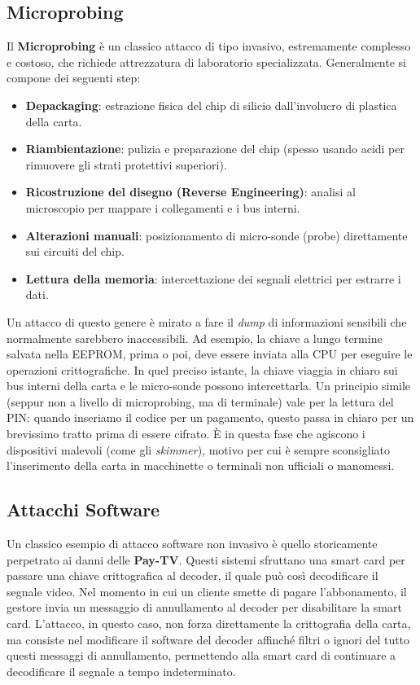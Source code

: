 \subsection*{Microprobing}
Il \textbf{Microprobing} è un classico attacco di tipo invasivo, estremamente complesso e costoso, che richiede attrezzatura di laboratorio specializzata. Generalmente si compone dei seguenti step:
\begin{itemize}
    \item \textbf{Depackaging}: estrazione fisica del chip di silicio dall'involucro di plastica della carta.
    \item \textbf{Riambientazione}: pulizia e preparazione del chip (spesso usando acidi per rimuovere gli strati protettivi superiori).
    \item \textbf{Ricostruzione del disegno (Reverse Engineering)}: analisi al microscopio per mappare i collegamenti e i bus interni.
    \item \textbf{Alterazioni manuali}: posizionamento di micro-sonde (probe) direttamente sui circuiti del chip.
    \item \textbf{Lettura della memoria}: intercettazione dei segnali elettrici per estrarre i dati.
\end{itemize}

Un attacco di questo genere è mirato a fare il \textit{dump} di informazioni sensibili che normalmente sarebbero inaccessibili. Ad esempio, la chiave a lungo termine salvata nella EEPROM, prima o poi, deve essere inviata alla CPU per eseguire le operazioni crittografiche. In quel preciso istante, la chiave viaggia in chiaro sui bus interni della carta e le micro-sonde possono intercettarla. 
Un principio simile (seppur non a livello di microprobing, ma di terminale) vale per la lettura del PIN: quando inseriamo il codice per un pagamento, questo passa in chiaro per un brevissimo tratto prima di essere cifrato. È in questa fase che agiscono i dispositivi malevoli (come gli \textit{skimmer}), motivo per cui è sempre sconsigliato l'inserimento della carta in macchinette o terminali non ufficiali o manomessi.

\subsection*{Attacchi Software}
Un classico esempio di attacco software non invasivo è quello storicamente perpetrato ai danni delle \textbf{Pay-TV}. Questi sistemi sfruttano una smart card per passare una chiave crittografica al decoder, il quale può così decodificare il segnale video. 
Nel momento in cui un cliente smette di pagare l'abbonamento, il gestore invia un messaggio di annullamento al decoder per disabilitare la smart card. L'attacco, in questo caso, non forza direttamente la crittografia della carta, ma consiste nel modificare il software del decoder affinché filtri o ignori del tutto questi messaggi di annullamento, permettendo alla smart card di continuare a decodificare il segnale a tempo indeterminato.

